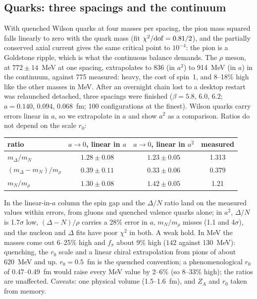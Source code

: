 \documentclass[11pt,a4paper]{article}
\begin{document}
\subsection{Quarks: three spacings and the continuum}
With quenched Wilson quarks at four masses per spacing, the pion mass squared falls linearly to zero with the quark mass (fit $\chi^2/{\rm dof}=0.81/2$),
and the partially conserved axial current gives the same critical point to $10^{-4}$: the pion is a Goldstone ripple, which is what the
continuous balance demands. The $\rho$ meson, at $772\pm14$~MeV at one spacing, extrapolates to 836 (in $a^2$) to 914~MeV (in $a$) in the continuum, against 775
measured: heavy, the cost of spin~1, and 8--18\% high like the other masses in MeV. After an
overnight chain lost to a desktop restart was relaunched detached, three spacings were finished ($\beta=5.8$, $6.0$, $6.2$; $a=0.140$, $0.094$,
$0.068$~fm; 100 configurations at the finest). Wilson quarks carry errors linear in $a$, so we extrapolate in $a$ and show $a^2$ as a comparison.
Ratios do not depend on the scale $r_0$:

\begin{center}\small
\begin{tabular}{@{}lccc@{}}
\toprule
ratio & $a\to0$, linear in $a$ & $a\to0$, linear in $a^2$ & measured \\
\midrule
$m_\Delta/m_N$ & $1.28\pm0.08$ & $1.23\pm0.05$ & 1.313 \\
$(m_\Delta-m_N)/m_\rho$ & $0.39\pm0.11$ & $0.33\pm0.06$ & 0.379 \\
$m_N/m_\rho$ & $1.30\pm0.08$ & $1.42\pm0.05$ & 1.21 \\
\bottomrule
\end{tabular}
\end{center}

\noindent In the linear-in-$a$ column the spin gap and the $\Delta/N$ ratio land on the measured values within errors, from gluons and
quenched valence quarks alone; in $a^2$, $\Delta/N$ is 1.7$\sigma$ low, $(\Delta-N)/\rho$ carries a 28\% error in $a$, $m_N/m_\rho$ misses
(1.1 and 4$\sigma$), and the nucleon and $\Delta$ fits have poor $\chi^2$ in both. A weak hold. In MeV the masses come out 6--25\% high and
$f_\pi$ about 9\% high ($142$ against 130~MeV): quenching, the $r_0$ scale and a linear chiral extrapolation from pions of about 620~MeV
and up. $r_0=0.5$~fm is the quenched convention; a phenomenological $r_0$ of 0.47--0.49~fm would raise every MeV value by 2--6\% (so 8--33\%
high); the ratios are unaffected. Caveats: one physical volume (1.5--1.6~fm), and $Z_A$ and $r_0$ taken from memory.
\end{document}
